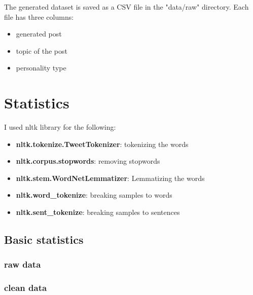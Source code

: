 The generated dataset is saved as a CSV file in the "data/raw" directory. Each file has three columns:
\begin{itemize}
    \item generated post
    \item topic of the post
    \item personality type
\end{itemize}



\section{Statistics}

I used nltk library for the following:
\begin{itemize}
    \item \textbf{nltk.tokenize.TweetTokenizer}: tokenizing the words
    \item \textbf{nltk.corpus.stopwords}: removing stopwords
    \item \textbf{nltk.stem.WordNetLemmatizer}: Lemmatizing the words
    \item \textbf{nltk.word\_tokenize}: breaking samples to words
    \item \textbf{nltk.sent\_tokenize}: breaking samples to sentences
\end{itemize}

\subsection{Basic statistics}



\subsubsection{raw data}
\begin{adjustbox}{max width=\textwidth}
\end{adjustbox}

\subsubsection{clean data}
\begin{adjustbox}{max width=\textwidth}
\end{adjustbox}


